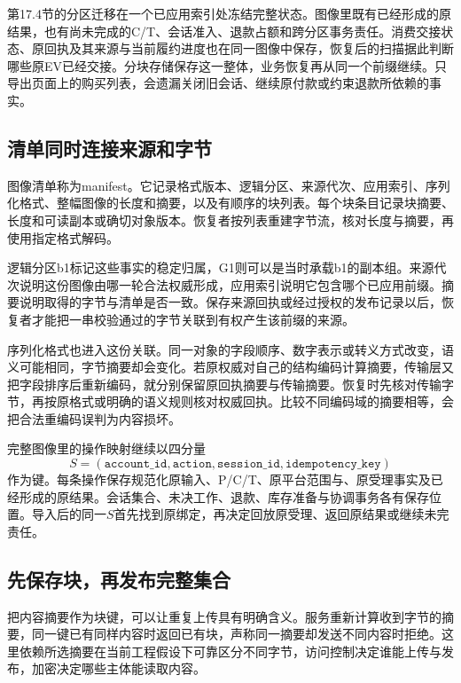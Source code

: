 第17.4节的分区迁移在一个已应用索引处冻结完整状态。图像里既有已经形成的原结果，也有尚未完成的C/T、会话准入、退款占额和跨分区事务责任。消费交接状态、原回执及其来源与当前履约进度也在同一图像中保存，恢复后的扫描据此判断哪些原EV已经交接。分块存储保存这一整体，业务恢复再从同一个前缀继续。只导出页面上的购买列表，会遗漏关闭旧会话、继续原付款或约束退款所依赖的事实。

\subsection{清单同时连接来源和字节}

图像清单称为manifest。它记录格式版本、逻辑分区、来源代次、应用索引、序列化格式、整幅图像的长度和摘要，以及有顺序的块列表。每个块条目记录块摘要、长度和可读副本或确切对象版本。恢复者按列表重建字节流，核对长度与摘要，再使用指定格式解码。


逻辑分区b1标记这些事实的稳定归属，G1则可以是当时承载b1的副本组。来源代次说明这份图像由哪一轮合法权威形成，应用索引说明它包含哪个已应用前缀。摘要说明取得的字节与清单是否一致。保存来源回执或经过授权的发布记录以后，恢复者才能把一串校验通过的字节关联到有权产生该前缀的来源。

序列化格式也进入这份关联。同一对象的字段顺序、数字表示或转义方式改变，语义可能相同，字节摘要却会变化。若原权威对自己的结构编码计算摘要，传输层又把字段排序后重新编码，就分别保留原回执摘要与传输摘要。恢复时先核对传输字节，再按原格式或明确的语义规则核对权威回执。比较不同编码域的摘要相等，会把合法重编码误判为内容损坏。


完整图像里的操作映射继续以四分量
\[
S=(\texttt{account\_id},\texttt{action},\texttt{session\_id},\texttt{idempotency\_key})
\]
作为键。每条操作保存规范化原输入、P/C/T、原平台范围与、原受理事实及已经形成的原结果。会话集合、未决工作、退款、库存准备与协调事务各有保存位置。导入后的同一$S$首先找到原绑定，再决定回放原受理、返回原结果或继续未完责任。

\subsection{先保存块，再发布完整集合}

把内容摘要作为块键，可以让重复上传具有明确含义。服务重新计算收到字节的摘要，同一键已有同样内容时返回已有块，声称同一摘要却发送不同内容时拒绝。这里依赖所选摘要在当前工程假设下可靠区分不同字节，访问控制决定谁能上传与发布，加密决定哪些主体能读取内容。

